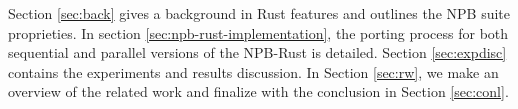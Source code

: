 

Section \ref{sec:back} gives a background in Rust features and outlines the NPB suite proprieties. In section \ref{sec:npb-rust-implementation}, the porting process for both sequential and parallel versions of the NPB-Rust is detailed. Section \ref{sec:expdisc} contains the experiments and results discussion. In Section \ref{sec:rw}, we make an overview of the related work and finalize with the conclusion in Section \ref{sec:conl}.

